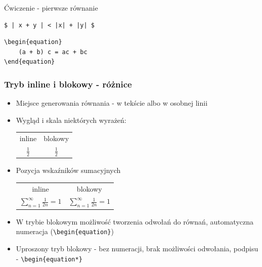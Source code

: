 \documentclass{beamer}
\theoremstyle{newblock}
\begin{document}
\begin{frame}[fragile=singleslide]{Ćwiczenie  - pierwsze równanie}

    \begin{examples}
        \begin{verbatim}
$ | x + y | < |x| + |y| $
        \end{verbatim}
    \end{examples}
    \begin{examples}
\begin{verbatim}
\begin{equation}
    (a + b) c = ac + bc
\end{equation}
\end{verbatim}
    \end{examples}
\end{frame}

\begin{frame}[fragile=singleslide]

    \frametitle{Tryb inline i blokowy - różnice}

    \begin{itemize}
        \item Miejsce generowania równania - w tekście albo w osobnej linii
        \item Wygląd i skala niektórych wyrażeń:
        
        
        \begin{center}
            \begin{tabular}{c c}
                inline & blokowy \\
                
                 $\frac{1}{2}$ & $\displaystyle \frac{1}{2}$\\
            \end{tabular}
        \end{center}
        
        \item Pozycja wskaźników sumacyjnych

        \begin{center}
        
            \begin{tabular}{c c}
                inline & blokowy \\
                
                 $\sum_{n=1}^{\infty} \frac{1}{2n} = 1 $ &
                 \(\displaystyle \sum_{n=1}^\infty  \frac{1}{2n} = 1 \) \\
            \end{tabular}
            
        \end{center}
        \item W trybie blokowym możliwość tworzenia odwołań do równań, automatyczna numeracja (\verb|\begin{equation}|)
        \item Uproszony tryb blokowy - bez numeracji, brak możliwości odwołania, podpisu - \verb|\begin{equation*}|
    \end{itemize}
\end{frame}
\end{document}

